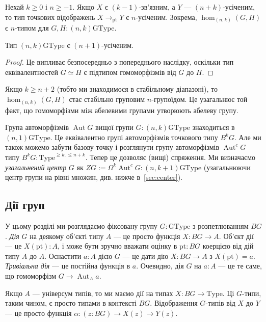\documentclass[12pt]{article}
\newcommand*{\Loop}{\Omega}
\newcommand*{\pt}{{\mathrm{pt}}}
\renewcommand*{\equiv}{\mathrel{\simeq}}
\DeclareMathOperator\Aut{Aut}
\newcommand*{\Type}{\mathrm{Type}}
\newcommand*{\GType}{\mathrm{GType}}
\newcommand*{\leanref}[1]{{\normalfont[\texttt{\color{DarkBlue}#1}]}}
\begin{document}
\begin{corollary}
  Нехай $k \ge 0$ і $n \ge -1$. Якщо $X$ є $(k-1)$-зв'язним, а $Y$ — $(n+k)$-усіченим, то тип точкових відображень $X \to_\pt Y$ є $n$-усіченим. Зокрема, $\hom_{(n,k)}(G,H)$ є $n$-типом для $G,H : (n,k)\GType$.
\end{corollary}

\begin{corollary}
  Тип $(n,k)\GType$ є $(n+1)$-усіченим. \leanref{is\_\allowbreak trunc\_\allowbreak GType}
\end{corollary}

\begin{proof}
  Це випливає безпосередньо з попереднього наслідку, оскільки тип еквівалентностей $G \equiv H$ є підтипом гомоморфізмів від $G$ до $H$.
\end{proof}

Якщо $k \ge n+2$ (тобто ми знаходимося в стабільному діапазоні), то $\hom_{(n,k)}(G,H)$ стає стабільно груповим $n$-групоїдом. Це узагальнює той факт, що гомоморфізми між абелевими групами утворюють абелеву групу.

Група автоморфізмів $\Aut G$ вищої групи $G : (n,k)\GType$ знаходиться в $(n,1)\GType$. Це еквівалентно групі автоморфізмів точкового типу $B^k G$. Але ми також можемо забути базову точку і розглянути групу автоморфізмів $\Aut^c G$ типу $B^k G : \Type^{\ge k,\le n+k}$. Тепер це дозволяє (вищі) спряження. Ми визначаємо \emph{узагальнений центр} $G$ як $ZG := \Loop^k \Aut^c G : (n,k+1)\GType$ (узагальнюючи центр групи на рівні множин, див. нижче в~\autoref{sec:center}).

\subsection{Дії груп}
\label{sec:actions}

У цьому розділі ми розглядаємо фіксовану групу $G : \GType$ з розпетлюванням $BG$. \emph{Дія} $G$ на деякому об'єкті типу $A$ — це просто функція $X : BG \to A$. Об'єкт дії — це $X(\pt) : A$, і може бути зручно вважати оцінку в $\pt : BG$ коерцією від дій типу $A$ до $A$. Оснастити $a : A$ дією $G$ — це дати дію $X : BG \to A$ з $X(\pt) = a$. \emph{Тривіальна дія} — це постійна функція в $a$. Очевидно, дія $G$ на $a : A$ — це те саме, що гомоморфізм $G \to \Aut_A a$.

Якщо $A$ — універсум типів, то ми маємо дії на типах $X : BG \to \Type$. Ці $G$-типи, таким чином, є просто типами в контексті $BG$. Відображення $G$-типів від $X$ до $Y$ — це просто функція $\alpha : (z : BG) \to X(z) \to Y(z)$.
\end{document}
